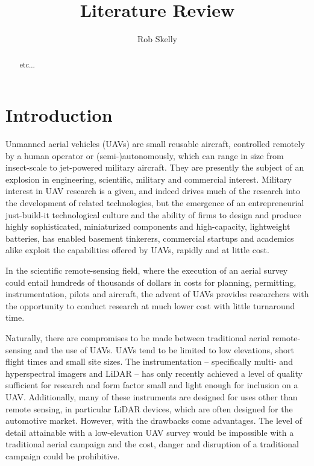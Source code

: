 \documentclass[10pt]{article}
\author{Rob Skelly}
\title{Literature Review}
\begin{document}
\maketitle

\begin{abstract}
etc...
\end{abstract}

\section{Introduction}

Unmanned aerial vehicles (UAVs) are small reusable aircraft, controlled remotely by a human operator or (semi-)autonomously, which can range in size from insect-scale to jet-powered military aircraft. They are presently the subject of an explosion in engineering, scientific, military and commercial interest. Military interest in UAV research is a given, and indeed drives much of the research into the development of related technologies, but the emergence of an entrepreneurial just-build-it technological culture and the ability of firms to design and produce highly sophisticated, miniaturized components and high-capacity, lightweight batteries, has enabled basement tinkerers, commercial startups and academics alike exploit the capabilities offered by UAVs, rapidly and at little cost.

In the scientific remote-sensing field, where the execution of an aerial survey could entail hundreds of thousands of dollars in costs for planning, permitting, instrumentation, pilots and aircraft, the advent of UAVs provides researchers with the opportunity to conduct research at much lower cost with little turnaround time. 

Naturally, there are compromises to be made between traditional aerial remote-sensing and the use of UAVs. UAVs tend to be limited to low elevations, short flight times and small site sizes. The instrumentation -- specifically multi- and hyperspectral imagers and LiDAR -- has only recently achieved a level of quality sufficient for research and form factor small and light enough for inclusion on a UAV. Additionally, many of these instruments are designed for uses other than remote sensing, in particular LiDAR devices, which are often designed for the automotive market. However, with the drawbacks come advantages. The level of detail attainable with a low-elevation UAV survey would be impossible with a traditional aerial campaign and the cost, danger and disruption of a traditional campaign could be prohibitive.
\end{document}
